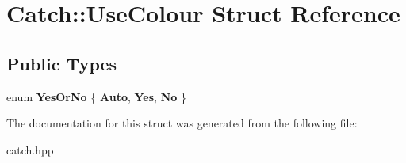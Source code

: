 \hypertarget{structCatch_1_1UseColour}{}\section{Catch\+::Use\+Colour Struct Reference}
\label{structCatch_1_1UseColour}
\subsection*{Public Types}
\begin{DoxyCompactItemize}
\item 
\mbox{\label{structCatch_1_1UseColour_a6aa78da0c2de7539bb9e3757e204a3f1}} 
enum {\bfseries Yes\+Or\+No} \{ {\bfseries Auto}, 
{\bfseries Yes}, 
{\bfseries No}
 \}
\end{DoxyCompactItemize}


The documentation for this struct was generated from the following file\+:\begin{DoxyCompactItemize}
\item 
catch.\+hpp\end{DoxyCompactItemize}
